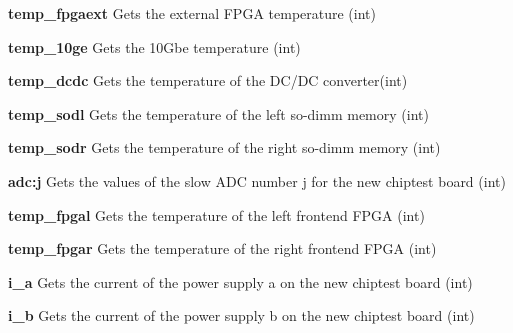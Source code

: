 \begin{DoxyItemize}
\item {\bfseries temp\_\-fpgaext} Gets the external FPGA temperature (int)
\end{DoxyItemize}


\begin{DoxyItemize}
\item {\bfseries temp\_\-10ge} Gets the 10Gbe temperature (int)
\end{DoxyItemize}


\begin{DoxyItemize}
\item {\bfseries temp\_\-dcdc} Gets the temperature of the DC/DC converter(int)
\end{DoxyItemize}


\begin{DoxyItemize}
\item {\bfseries temp\_\-sodl} Gets the temperature of the left so-\/dimm memory (int)
\end{DoxyItemize}


\begin{DoxyItemize}
\item {\bfseries temp\_\-sodr} Gets the temperature of the right so-\/dimm memory (int)
\end{DoxyItemize}


\begin{DoxyItemize}
\item {\bfseries adc:j} Gets the values of the slow ADC number j for the new chiptest board (int)
\end{DoxyItemize}


\begin{DoxyItemize}
\item {\bfseries temp\_\-fpgal} Gets the temperature of the left frontend FPGA (int)
\end{DoxyItemize}


\begin{DoxyItemize}
\item {\bfseries temp\_\-fpgar} Gets the temperature of the right frontend FPGA (int)
\end{DoxyItemize}


\begin{DoxyItemize}
\item {\bfseries i\_\-a} Gets the current of the power supply a on the new chiptest board (int)
\end{DoxyItemize}


\begin{DoxyItemize}
\item {\bfseries i\_\-b} Gets the current of the power supply b on the new chiptest board (int)
\end{DoxyItemize}


